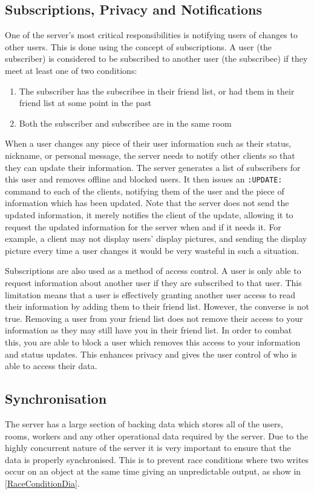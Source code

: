\subsection{Subscriptions, Privacy and Notifications}
One of the server's most critical responsibilities is notifying users of changes to other users. This is done using the concept of subscriptions. A user (the subscriber) is considered to be subscribed to another user (the subscribee) if they meet at least one of two conditions:

\begin{enumerate}
\item{The subscriber has the subscribee in their friend list, or had them in their friend list at some point in the past}
\item{Both the subscriber and subscribee are in the same room}
\end{enumerate}

When a user changes any piece of their user information such as their status, nickname, or personal message, the server needs to notify other clients so that they can update their information. The server generates a list of subscribers for this user and removes offline and blocked users. It then issues an \texttt{:UPDATE:} command to each of the clients, notifying them of the user and the piece of information which has been updated. Note that the server does not send the updated information, it merely notifies the client of the update, allowing it to request the updated information for the server when and if it needs it. For example, a client may not display users' display pictures, and sending the display picture every time a user changes it would be very wasteful in such a situation.

Subscriptions are also used as a method of access control. A user is only able to request information about another user if they are subscribed to that user. This limitation means that a user is effectively granting another user access to read their information by adding them to their friend list. However, the converse is not true. Removing a user from your friend list does not remove their access to your information as they may still have you in their friend list. In order to combat this, you are able to block a user which removes this access to your information and status updates. This enhances privacy and gives the user control of who is able to access their data.

\subsection{Synchronisation}
The server has a large section of backing data which stores all of the users, rooms, workers and any other operational data required by the server. Due to the highly concurrent nature of the server it is very important to ensure that the data is properly synchronised. This is to prevent race conditions where two writes occur on an object at the same time giving an unpredictable output, as show in \ref{RaceConditionDia}.

